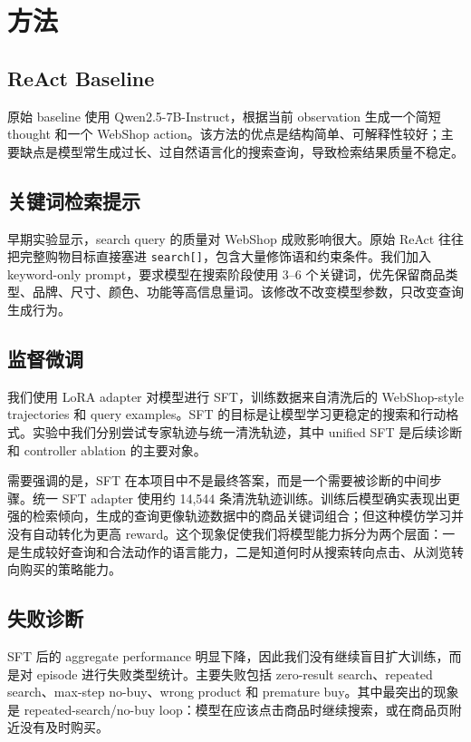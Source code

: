 \documentclass[11pt]{article}
\begin{document}
\section{方法}

\subsection{ReAct Baseline}

原始 baseline 使用 Qwen2.5-7B-Instruct，根据当前 observation 生成一个简短 thought 和一个 WebShop action。该方法的优点是结构简单、可解释性较好；主要缺点是模型常生成过长、过自然语言化的搜索查询，导致检索结果质量不稳定。

\subsection{关键词检索提示}

早期实验显示，search query 的质量对 WebShop 成败影响很大。原始 ReAct 往往把完整购物目标直接塞进 \texttt{search[]}，包含大量修饰语和约束条件。我们加入 keyword-only prompt，要求模型在搜索阶段使用 3--6 个关键词，优先保留商品类型、品牌、尺寸、颜色、功能等高信息量词。该修改不改变模型参数，只改变查询生成行为。

\subsection{监督微调}

我们使用 LoRA adapter 对模型进行 SFT，训练数据来自清洗后的 WebShop-style trajectories 和 query examples。SFT 的目标是让模型学习更稳定的搜索和行动格式。实验中我们分别尝试专家轨迹与统一清洗轨迹，其中 unified SFT 是后续诊断和 controller ablation 的主要对象。

需要强调的是，SFT 在本项目中不是最终答案，而是一个需要被诊断的中间步骤。统一 SFT adapter 使用约 14,544 条清洗轨迹训练。训练后模型确实表现出更强的检索倾向，生成的查询更像轨迹数据中的商品关键词组合；但这种模仿学习并没有自动转化为更高 reward。这个现象促使我们将模型能力拆分为两个层面：一是生成较好查询和合法动作的语言能力，二是知道何时从搜索转向点击、从浏览转向购买的策略能力。

\subsection{失败诊断}

SFT 后的 aggregate performance 明显下降，因此我们没有继续盲目扩大训练，而是对 episode 进行失败类型统计。主要失败包括 zero-result search、repeated search、max-step no-buy、wrong product 和 premature buy。其中最突出的现象是 repeated-search/no-buy loop：模型在应该点击商品时继续搜索，或在商品页附近没有及时购买。
\end{document}
